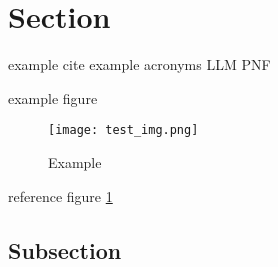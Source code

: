 \section{Section}\label{sec:section}
example cite \cite{poktscan_open_nodate} \cite{gao_framework_2023}
example acronyms \gls{LLM} \gls{PNF}

example figure

\begin{figure}[H]
    \centering
    \texttt{[image: test\_img.png]}
    \caption{Example}
    \label{fig:example}
\end{figure}

reference figure \ref{fig:example}

\subsection{Subsection}


